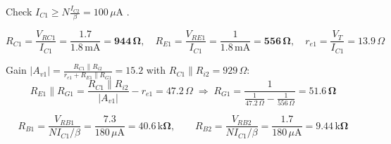 \documentclass[11pt]{article}
\begin{document}
Check $I_{C1} \ge N\frac{I_{C2}}{\beta} = 100\,\mu \mathrm{A}$ \checkmark. 

\[R_{C1} = \frac{V_{RC1}}{I_{C1}} = \frac{1.7}{1.8\,\mathrm{m}\mathrm{A}} = \mathbf{944\,\Omega},\quad R_{E1} = \frac{V_{RE1}}{I_{C1}} = \frac{1}{1.8\,\mathrm{m}\mathrm{A}} = \mathbf{556\,\Omega},\quad r_{e1} = \frac{V_T}{I_{C1}} = 13.9\,\Omega\]

Gain $|A_{v1}| = \frac{R_{C1}\|R_{i2}}{r_{e1} + R_{E1}\|R_{G1}} = 15.2$ with $R_{C1}\|R_{i2} = 929\,\Omega$:\[R_{E1}\|R_{G1} = \frac{R_{C1}\|R_{i2}}{|A_{v1}|} - r_{e1} = 47.2\,\Omega \;\Rightarrow\; R_{G1} = \frac{1}{\frac{1}{47.2\,\Omega} - \frac{1}{556\,\Omega}} = \mathbf{51.6\,\Omega}\]

\[R_{B1} = \frac{V_{RB1}}{N I_{C1}/\beta} = \frac{7.3}{180\,\mu \mathrm{A}} = \mathbf{40.6\,\mathrm{k}\Omega},\qquad R_{B2} = \frac{V_{RB2}}{N I_{C1}/\beta} = \frac{1.7}{180\,\mu \mathrm{A}} = \mathbf{9.44\,\mathrm{k}\Omega}\]
\end{document}
